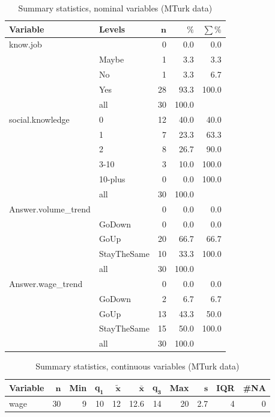 \documentclass[a4paper,10pt]{article}\usepackage[]{graphicx}\usepackage[]{color}
\begin{document}
\begin{table}[ht]
\centering
{\footnotesize
\begin{tabular}{ll|rrr}
 \textbf{Variable} & \textbf{Levels} & $\mathbf{n}$ & $\mathbf{\%}$ & $\mathbf{\sum \%}$ \\ 
  \hline
know.job &  & 0 & 0.0 & 0.0 \\ 
   & Maybe & 1 & 3.3 & 3.3 \\ 
   & No & 1 & 3.3 & 6.7 \\ 
   & Yes & 28 & 93.3 & 100.0 \\ 
   \hline
 & all & 30 & 100.0 &  \\ 
   \hline
\hline
social.knowledge & 0 & 12 & 40.0 & 40.0 \\ 
   & 1 & 7 & 23.3 & 63.3 \\ 
   & 2 & 8 & 26.7 & 90.0 \\ 
   & 3-10 & 3 & 10.0 & 100.0 \\ 
   & 10-plus & 0 & 0.0 & 100.0 \\ 
   \hline
 & all & 30 & 100.0 &  \\ 
   \hline
\hline
Answer.volume\_trend &  & 0 & 0.0 & 0.0 \\ 
   & GoDown & 0 & 0.0 & 0.0 \\ 
   & GoUp & 20 & 66.7 & 66.7 \\ 
   & StayTheSame & 10 & 33.3 & 100.0 \\ 
   \hline
 & all & 30 & 100.0 &  \\ 
   \hline
\hline
Answer.wage\_trend &  & 0 & 0.0 & 0.0 \\ 
   & GoDown & 2 & 6.7 & 6.7 \\ 
   & GoUp & 13 & 43.3 & 50.0 \\ 
   & StayTheSame & 15 & 50.0 & 100.0 \\ 
   \hline
 & all & 30 & 100.0 &  \\ 
   \hline
\hline
\end{tabular}
}
\caption{Summary statistics, nominal variables (MTurk data)} 
\label{tab1:39-9010}
\end{table}
\begin{table}[ht]
\centering
{\footnotesize
\begin{tabular}{lrrrrrrrrrr}
 \textbf{Variable} & $\mathbf{n}$ & \textbf{Min} & $\mathbf{q_1}$ & $\mathbf{\widetilde{x}}$ & $\mathbf{\bar{x}}$ & $\mathbf{q_3}$ & \textbf{Max} & $\mathbf{s}$ & \textbf{IQR} & \textbf{\#NA} \\ 
  \hline
wage & 30 & 9 & 10 & 12 & 12.6 & 14 & 20 & 2.7 & 4 & 0 \\ 
  \end{tabular}
}
\caption{Summary statistics, continuous variables (MTurk data)} 
\label{tab2:39-9010}
\end{table}
\end{document}
